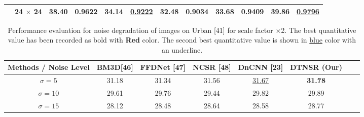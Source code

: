 \documentclass[journal]{IEEEtran}
\begin{document}
\begin{table*}
\begin{tabular}{|c|c|cc|cc|cc|cc|cc|}
            & {24 $\times$ 24} & \multicolumn{1}{c|}{\color{red}\textbf{38.40}} &{\color{red}\textbf{0.9622}}  & \multicolumn{1}{c|}{\color{red}\textbf{34.14}} &{\color{blue}\underline{0.9222}} & \multicolumn{1}{c|}{\color{red}\textbf{32.48}} &{\color{red}\textbf{0.9034}} & \multicolumn{1}{c|}{\color{red}\textbf{33.68}} &{\color{red}\textbf{0.9409}}  & \multicolumn{1}{c|}{\color{red}\textbf{39.86}} &{\color{blue}\underline{0.9796}}  \\
  \hline
\end{tabular}
\end{table*}

\vspace{-\baselineskip}
\vspace{-\baselineskip}
\vspace{-\baselineskip}
\vspace{-\baselineskip}
\vspace{-\baselineskip}

\begin{table*}
\centering
\caption{Performance evaluation for noise degradation of images on Urban [41] for scale factor $\times$2. The best quantitative value has been recorded as bold with {\color{red}\textbf{Red }} color. The second best quantitative value is shown in {\color{blue}\underline{blue}} color with an underline.}

\label{table6}
\setlength{\tabcolsep}{1 pt}
\begin{tabular}{|c|c|c|c|c|c|c|c|} %
\hline

\multirow{1}{*}{Methods / Noise Level} & \multirow{1}{*}{BM3D[46]} & \multirow{1}{*}{FFDNet [47]} & \multirow{1}{*}{NCSR [48]}  & \multirow{1}{*}{DnCNN [23]} & \multirow{1}{*}{DTNSR (Our)}\\

\hline
$\sigma = 5$ & {31.18} & {31.34} & {31.56} & {\color{blue}\underline{31.67}} & {\color{red}\textbf{31.78}}   \\
$\sigma = 10$ & {29.61} & {29.76} & {29.44} & {29.82} & {29.89}   \\
$\sigma = 15$ & {28.12} & {28.48} & {28.64} & {28.58} & {28.77}   \\
    
\hline
\end{tabular}
\end{table*}
\end{document}
